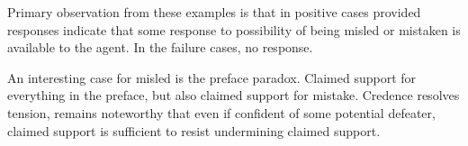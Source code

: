 \begin{note}
  Primary observation from these examples is that in positive cases provided responses indicate that some response to possibility of being misled or mistaken is available to the agent.
  In the failure cases, no response.


  An interesting case for misled is the preface paradox.
  Claimed support for everything in the preface, but also claimed support for mistake.
  Credence resolves tension, remains noteworthy that even if confident of some potential defeater, claimed support is sufficient to resist undermining claimed support.
\end{note}

